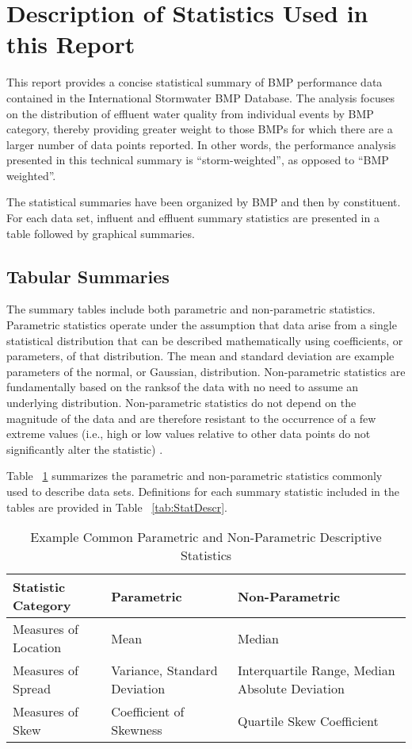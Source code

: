 \section[Description of Statistics]{Description of Statistics Used in this Report}
This report provides a concise statistical summary of BMP performance data
contained in the International Stormwater BMP Database.  The analysis focuses
on the distribution of effluent water quality from individual events by BMP
category, thereby providing greater weight to those BMPs for which there are a
larger number of data points reported. In other words, the performance analysis
presented in this technical summary is ``storm-weighted'', as opposed to
``BMP weighted''\footnotemark[1].

The statistical summaries have been organized by BMP and then by constituent.
For each data set, influent and effluent summary statistics are presented in a
table followed by graphical summaries.

\subsection{Tabular Summaries}
The summary tables include both parametric and non-parametric statistics.
Parametric statistics operate under the assumption that data arise from a
single statistical distribution that can be described mathematically using
coefficients, or parameters, of that distribution.  The mean and standard
deviation are example parameters of the normal, or Gaussian, distribution.
Non-parametric statistics are fundamentally based on the ranks\footnotemark[2]
of the data with no need to assume an underlying distribution.  Non-parametric
statistics do not depend on the magnitude of the data and are therefore
resistant to the occurrence of a few extreme values (i.e., high or low values
relative to other data points do not significantly alter the statistic)
\footnotemark[3].

Table ~\ref{tab:StatList} summarizes the parametric and non-parametric
statistics commonly used to describe data sets. Definitions for each summary
statistic included in the tables are provided in Table ~\ref{tab:StatDescr}.

\begin{table}[b!ht]
    \caption{Example Common Parametric and Non-Parametric Descriptive Statistics}
    \label{tab:StatList}
    \centering
    \begin{tabular}{p{1.5in} p{1.5in} p{1.5in}}
    \toprule
    \textbf{Statistic Category} & \textbf{Parametric} & \textbf{Non-Parametric} \\
    \toprule
    Measures of Location & Mean & Median \\
    \midrule
    Measures of Spread & Variance, Standard Deviation & Interquartile Range, Median Absolute Deviation \\
    \midrule
    Measures of Skew & Coefficient of Skewness & Quartile Skew Coefficient \\
    \bottomrule
    \end{tabular}
\end{table}


